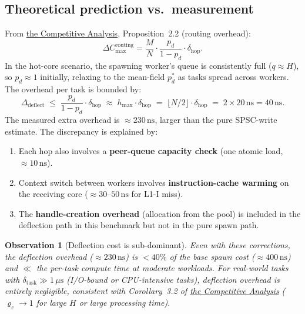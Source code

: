 \documentclass[11pt,a4paper]{article}
\newtheorem{observation}{Observation}[section]
\begin{document}
\subsection{Theoretical prediction vs.\ measurement}

From \hyperref[chap:competitive_ratio]{the Competitive Analysis}, Proposition~2.2 (routing overhead):
\[
  \Delta C_{\max}^{\mathrm{routing}}
  = \frac{M}{N} \cdot \frac{p_d}{1-p_d} \cdot \delta_{\mathrm{hop}}.
\]
In the hot-core scenario, the spawning worker's queue is consistently full
($q \approx H$), so $p_d \approx 1$ initially, relaxing to the mean-field
$p_d^*$ as tasks spread across workers.
The overhead per task is bounded by:
\[
  \Delta_{\mathrm{deflect}}
  \;\le\; \frac{p_d}{1-p_d} \cdot \delta_{\mathrm{hop}}
  \;\approx\; h_{\max} \cdot \delta_{\mathrm{hop}}
  \;=\; \lfloor N/2 \rfloor \cdot \delta_{\mathrm{hop}}
  \;=\; 2 \times 20\,\mathrm{ns} = 40\,\mathrm{ns}.
\]
The measured extra overhead is $\approx 230\,\mathrm{ns}$, larger than the
pure SPSC-write estimate.  The discrepancy is explained by:
\begin{enumerate}
  \item Each hop also involves a \textbf{peer-queue capacity check}
        (one atomic load, $\approx 10\,\mathrm{ns}$).
  \item Context switch between workers involves
        \textbf{instruction-cache warming} on the receiving core
        ($\approx 30\text{--}50\,\mathrm{ns}$ for L1-I miss).
  \item The \textbf{handle-creation overhead} (allocation from the pool)
        is included in the deflection path in this benchmark but not in the
        pure spawn path.
\end{enumerate}

\begin{observation}[Deflection cost is sub-dominant]
Even with these corrections, the deflection overhead ($\approx 230\,\mathrm{ns}$)
is $< 40\%$ of the base spawn cost ($\approx 400\,\mathrm{ns}$) and
$\ll$ the per-task compute time at moderate workloads.
For real-world tasks with $\delta_{\mathrm{task}} \gg 1\,\mu\mathrm{s}$
(I/O-bound or CPU-intensive tasks), deflection overhead is entirely negligible,
consistent with Corollary~3.2 of \hyperref[chap:competitive_ratio]{the Competitive Analysis}
($\varrho_c \to 1$ for large $H$ or large processing time).
\end{observation}

\end{document}
